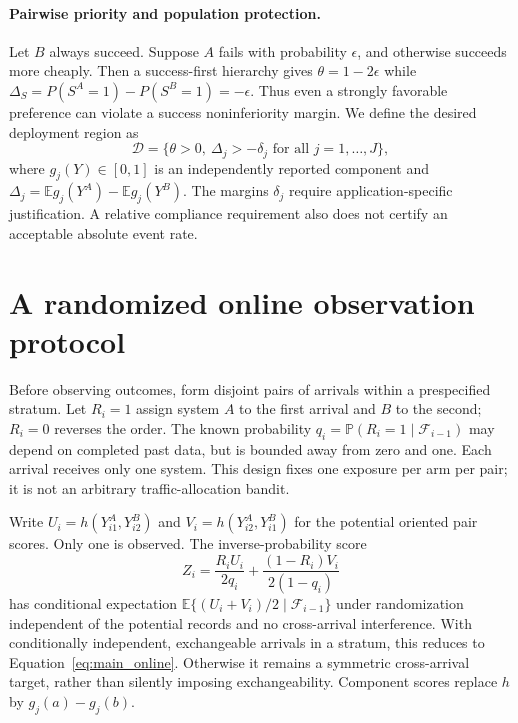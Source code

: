 \documentclass{article}
\newcommand{\E}{\mathbb E}
\newcommand{\Prob}{\mathbb P}
\begin{document}
\paragraph{Pairwise priority and population protection.}
Let $B$ always succeed. Suppose $A$ fails with probability $\epsilon$,
and otherwise succeeds more cheaply. Then a success-first hierarchy gives
$\theta=1-2\epsilon$ while
$\Delta_S=P(S^A=1)-P(S^B=1)=-\epsilon$.
Thus even a strongly favorable preference can violate a success
noninferiority margin. We define the desired deployment region as
\begin{equation}
 \mathcal D=\{\theta>0,\ \Delta_j> -\delta_j\text{ for all }j=1,\ldots,J\},
 \label{eq:main_region}
\end{equation}
where $g_j(Y)\in[0,1]$ is an independently reported component and
$\Delta_j=\E g_j(Y^A)-\E g_j(Y^B)$. The margins $\delta_j$ require
application-specific justification. A relative compliance requirement
also does not certify an acceptable absolute event rate.

\section{A randomized online observation protocol}
\label{sec:online}
Before observing outcomes, form disjoint pairs of arrivals within a
prespecified stratum. Let $R_i=1$ assign system $A$ to the first arrival
and $B$ to the second; $R_i=0$ reverses the order. The known probability
$q_i=\Prob(R_i=1\mid\mathcal F_{i-1})$ may depend on completed past data,
but is bounded away from zero and one. Each arrival receives only one
system. This design fixes one exposure per arm per pair; it is not an
arbitrary traffic-allocation bandit.

Write $U_i=h(Y^A_{i1},Y^B_{i2})$ and
$V_i=h(Y^A_{i2},Y^B_{i1})$ for the potential oriented pair scores. Only
one is observed. The inverse-probability score
\begin{equation}
 Z_i=\frac{R_iU_i}{2q_i}+
          \frac{(1-R_i)V_i}{2(1-q_i)}
 \label{eq:main_ht}
\end{equation}
has conditional expectation $\E\{(U_i+V_i)/2\mid\mathcal F_{i-1}\}$
under randomization independent of the potential records and no
cross-arrival interference. With conditionally independent, exchangeable
arrivals in a stratum, this reduces to
Equation~\eqref{eq:main_online}. Otherwise it remains a symmetric
cross-arrival target, rather than silently imposing exchangeability.
Component scores replace $h$ by $g_j(a)-g_j(b)$.
\end{document}
